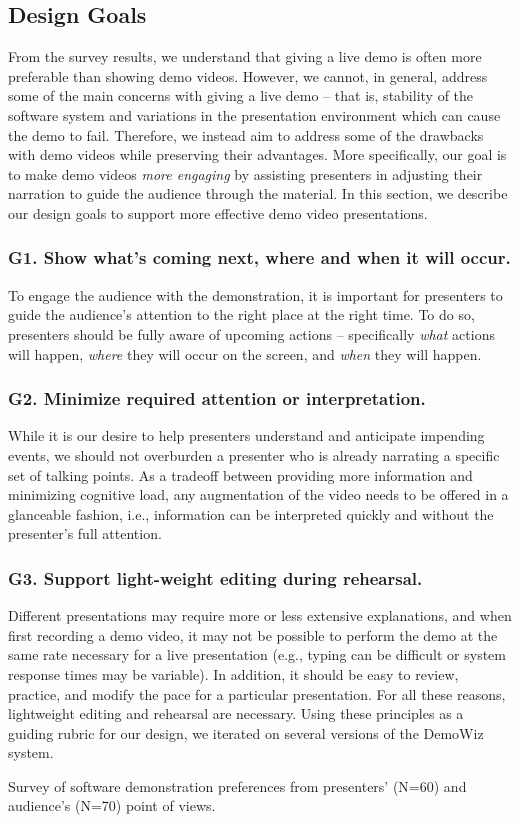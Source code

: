 \subsection{Design Goals} From the survey results, we understand that giving a live demo is often more preferable than showing demo videos. However, we cannot, in general, address some of the main concerns with giving a live demo – that is, stability of the software system and variations in the presentation environment which can cause the demo to fail. Therefore, we instead aim to address some of the drawbacks with demo videos while preserving their advantages. More specifically, our goal is to make demo videos \textit{more engaging} by assisting presenters in adjusting their narration to guide the audience through the material. In this section, we describe our design goals to support more effective demo video presentations.

\subsubsection{G1. Show what's coming next, where and when it will occur.}
To engage the audience with the demonstration, it is important for presenters to guide the audience's attention to the right place at the right time. To do so, presenters should be fully aware of upcoming actions – specifically \textit{what} actions will happen, \textit{where} they will occur on the screen, and \textit{when} they will happen.

\subsubsection{G2. Minimize required attention or interpretation.}
While it is our desire to help presenters understand and anticipate impending events, we should not overburden a presenter who is already narrating a specific set of talking points. As a tradeoff between providing more information and minimizing cognitive load, any augmentation of the video needs to be offered in a glanceable fashion, i.e., information can be interpreted quickly and without the presenter's full attention.

\subsubsection{G3. Support light-weight editing during rehearsal.}
Different presentations may require more or less extensive explanations, and when first recording a demo video, it may not be possible to perform the demo at the same rate necessary for a live presentation (e.g., typing can be difficult or system response times may be variable). In addition, it should be easy to review, practice, and modify the pace for a particular presentation. For all these reasons, lightweight editing and rehearsal are necessary.  Using these principles as a guiding rubric for our design, we iterated on several versions of the DemoWiz system.

\begin{table}
  \centering
  \caption{Survey of software demonstration preferences from presenters' (N=60) and audience's (N=70) point of views.}
  \label{tab:demowiz_survey}
\end{table}

